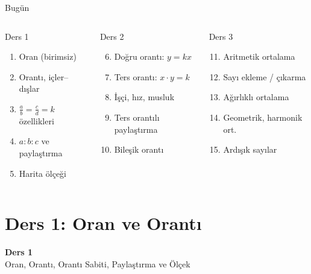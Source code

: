 \documentclass[aspectratio=169,11pt,handout]{beamer}
\begin{document}
\begin{frame}{Bugün}
\begin{columns}[t]
\begin{block}{Ders 1}
\begin{enumerate}
\item Oran (birimsiz)
\item Orantı, içler--dışlar
\item \(\frac{a}{b}=\frac{c}{d}=k\) özellikleri
\item \(a:b:c\) ve paylaştırma
\item Harita ölçeği
\end{enumerate}
\end{block}
\begin{block}{Ders 2}
\begin{enumerate}\setcounter{enumi}{5}
\item Doğru orantı: \(y=kx\)
\item Ters orantı: \(x\cdot y=k\)
\item İşçi, hız, musluk
\item Ters orantılı paylaştırma
\item Bileşik orantı
\end{enumerate}
\end{block}
\begin{block}{Ders 3}
\begin{enumerate}\setcounter{enumi}{10}
\item Aritmetik ortalama
\item Sayı ekleme / çıkarma
\item Ağırlıklı ortalama
\item Geometrik, harmonik ort.
\item Ardışık sayılar
\end{enumerate}
\end{block}
\end{columns}
\end{frame}

\section{Ders 1: Oran ve Orantı}
\begin{frame}
\centering\Large\color{anamavi}\textbf{Ders 1}\\[6pt]\normalsize Oran, Orantı, Orantı Sabiti, Paylaştırma ve Ölçek
\end{frame}
\end{document}
